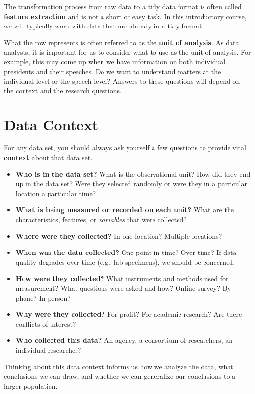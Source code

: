 \documentclass[
]{book}
\providecommand{\tightlist}{%
  \setlength{\itemsep}{0pt}\setlength{\parskip}{0pt}}
\begin{document}
The transformation process from raw data to a tidy data format is often called \textbf{feature extraction} and is not a short or easy task. In this introductory course, we will typically work with data that are already in a tidy format.

What the row represents is often referred to as the \textbf{unit of analysis}. As data analysts, it is important for us to consider what to use as the unit of analysis. For example, this may come up when we have information on both individual presidents and their speeches. Do we want to understand matters at the individual level or the speech level? Answers to these questions will depend on the context and the research questions.

\hypertarget{data-context}{%
\section{Data Context}\label{data-context}}

For any data set, you should always ask yourself a few questions to provide vital \textbf{context} about that data set.

\begin{itemize}
\tightlist
\item
  \textbf{Who is in the data set?} What is the observational unit? How did they end up in the data set? Were they selected randomly or were they in a particular location a particular time?
\item
  \textbf{What is being measured or recorded on each unit?} What are the characteristics, features, or \emph{variables} that were collected?
\item
  \textbf{Where were they collected?} In one location? Multiple locations?
\item
  \textbf{When was the data collected?} One point in time? Over time? If data quality degrades over time (e.g.~lab specimens), we should be concerned.
\item
  \textbf{How were they collected?} What instruments and methods used for measurement? What questions were asked and how? Online survey? By phone? In person?
\item
  \textbf{Why were they collected?} For profit? For academic research? Are there conflicts of interest?
\item
  \textbf{Who collected this data?} An agency, a consortium of researchers, an individual researcher?
\end{itemize}

Thinking about this data context informs us how we analyze the data, what conclusions we can draw, and whether we can generalize our conclusions to a larger population.
\end{document}

